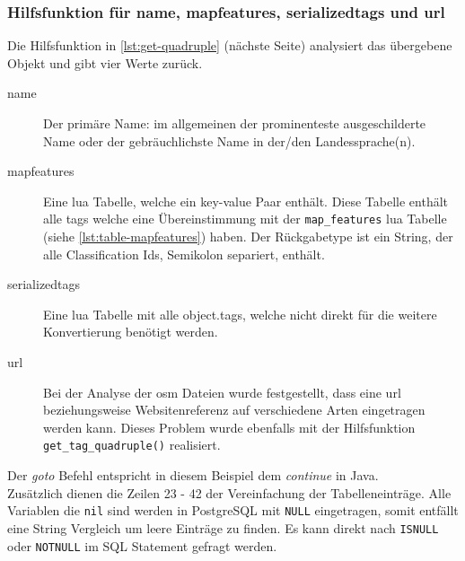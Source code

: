 \subsubsection{Hilfsfunktion für name, mapfeatures, serializedtags und url}\label{subsubsec:get.quadruple}
Die Hilfsfunktion in \autoref{lst:get-quadruple} (nächste Seite) analysiert das übergebene Objekt und gibt vier Werte zurück.
\begin{description}
	\item[name] Der primäre Name: im allgemeinen der prominenteste ausgeschilderte Name oder der gebräuchlichste Name in der/den Landessprache(n). 
	\item[mapfeatures] Eine lua Tabelle, welche ein key-value Paar enthält. Diese Tabelle enthält alle tags welche eine Übereinstimmung mit der \lstinline|map_features| lua Tabelle (siehe \autoref{lst:table-mapfeatures}) haben. Der Rückgabetype ist ein String, der alle Classification Ids, Semikolon separiert, enthält.
	\item[serializedtags] Eine lua Tabelle mit alle object.tags, welche nicht direkt für die weitere Konvertierung benötigt werden.
	\item[url] Bei der Analyse der osm Dateien wurde festgestellt, dass eine url beziehungsweise Websitenreferenz auf verschiedene Arten eingetragen werden kann. Dieses Problem wurde ebenfalls mit der Hilfsfunktion \lstinline| get_tag_quadruple()| realisiert.
\end{description}
Der \textit{goto} Befehl entspricht in diesem Beispiel dem \textit{continue} in Java.\\
Zusätzlich dienen die Zeilen 23 - 42 der Vereinfachung der Tabelleneinträge. Alle Variablen die \lstinline|nil| sind werden in PostgreSQL mit \lstinline|NULL| eingetragen, somit entfällt eine String Vergleich um leere Einträge zu finden. Es kann direkt nach \lstinline|ISNULL| oder \lstinline|NOTNULL| im SQL Statement gefragt werden.


